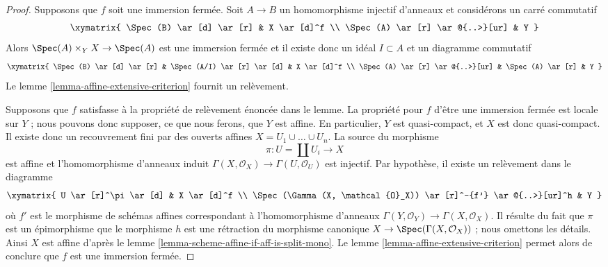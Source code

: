 \begin{proof}
Supposons que $f$ soit une immersion fermée. Soit $A \to B$ un homomorphisme injectif
d'anneaux et considérons un carré commutatif
$$
\xymatrix{
\Spec(B) \ar[d] \ar[r]  & X \ar[d]^f \\
\Spec(A) \ar[r] \ar@{..>}[ur] & Y
}
$$
Alors $\Spec(A) \times_Y X \to \Spec(A)$ est une immersion fermée et
il existe donc un idéal $I \subset A$ et un diagramme commutatif
$$
\xymatrix{
\Spec(B) \ar[d] \ar[r] & \Spec(A/I) \ar[r] \ar[d] & X \ar[d]^f \\
\Spec(A) \ar[r] \ar@{..>}[ur] & \Spec(A) \ar[r] & Y
}
$$
Le lemme \ref{lemma-affine-extensive-criterion} fournit un relèvement.

\medskip\noindent
Supposons que $f$ satisfasse à la propriété de relèvement énoncée dans le lemme.
La propriété pour $f$ d'être une immersion fermée est locale sur $Y$ ;
nous pouvons donc supposer, ce que nous ferons, que $Y$ est affine.
En particulier, $Y$ est quasi-compact, et $X$ est donc quasi-compact.
Il existe donc un recouvrement fini par des ouverts affines $X = U_1 \cup \ldots \cup U_n$.
La source du morphisme
$$
\pi : U = \coprod U_i \longrightarrow X
$$
est affine et l'homomorphisme d'anneaux induit
$\Gamma(X, \mathcal{O}_X) \to \Gamma(U, \mathcal{O}_U)$
est injectif. Par hypothèse, il existe un relèvement dans le diagramme
$$
\xymatrix{
U \ar[r]^\pi \ar[d] & X \ar[d]^f \\
\Spec(\Gamma(X, \mathcal{O}_X)) \ar[r]^-{f'} \ar@{..>}[ur]^h & Y
}
$$
où $f'$ est le morphisme de schémas affines correspondant à
l'homomorphisme d'anneaux $\Gamma(Y, \mathcal{O}_Y) \to \Gamma(X, \mathcal{O}_X)$.
Il résulte du fait que $\pi$ est un épimorphisme
que le morphisme $h$ est une rétraction du morphisme canonique
$X \to \Spec(\Gamma(X, \mathcal{O}_X))$ ; nous omettons les détails. Ainsi $X$ est affine d'après le
lemme \ref{lemma-scheme-affine-if-aff-is-split-mono}.
Le lemme \ref{lemma-affine-extensive-criterion} permet alors de
conclure que $f$ est une immersion fermée.
\end{proof}











